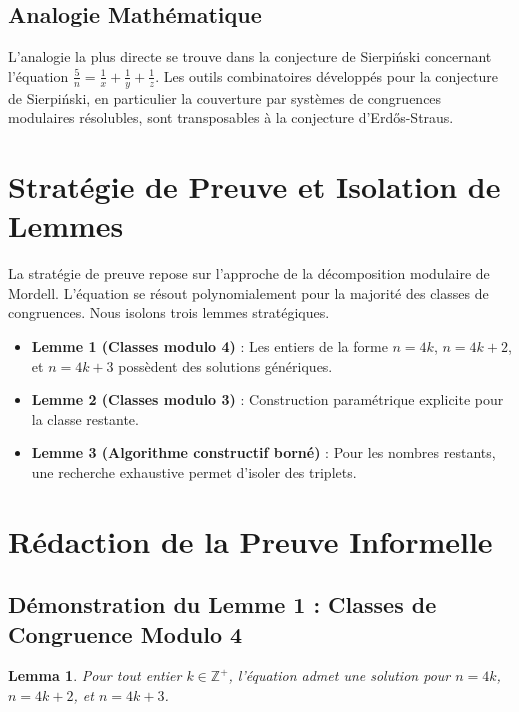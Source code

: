 \documentclass[11pt,a4paper]{article}
\newtheorem{lemma}[theorem]{Lemma}
\begin{document}
\subsection{Analogie Mathématique}
L'analogie la plus directe se trouve dans la conjecture de Sierpi\'{n}ski concernant l'équation $\frac{5}{n} = \frac{1}{x} + \frac{1}{y} + \frac{1}{z}$. Les outils combinatoires développés pour la conjecture de Sierpi\'{n}ski, en particulier la couverture par systèmes de congruences modulaires résolubles, sont transposables à la conjecture d'Erd\H{o}s-Straus.

\section{Stratégie de Preuve et Isolation de Lemmes}

La stratégie de preuve repose sur l'approche de la décomposition modulaire de Mordell. L'équation se résout polynomialement pour la majorité des classes de congruences. Nous isolons trois lemmes stratégiques.

\begin{itemize}
\item \textbf{Lemme 1 (Classes modulo 4)} : Les entiers de la forme $n = 4k$, $n = 4k+2$, et $n = 4k+3$ possèdent des solutions génériques.
\item \textbf{Lemme 2 (Classes modulo 3)} : Construction paramétrique explicite pour la classe restante.
\item \textbf{Lemme 3 (Algorithme constructif borné)} : Pour les nombres restants, une recherche exhaustive permet d'isoler des triplets.
\end{itemize}

\section{Rédaction de la Preuve Informelle}

\subsection{Démonstration du Lemme 1 : Classes de Congruence Modulo 4}
\begin{lemma}
Pour tout entier $k \in \mathbb{Z}^{+}$, l'équation admet une solution pour $n = 4k$, $n = 4k+2$, et $n = 4k+3$.
\end{lemma}
\end{document}
